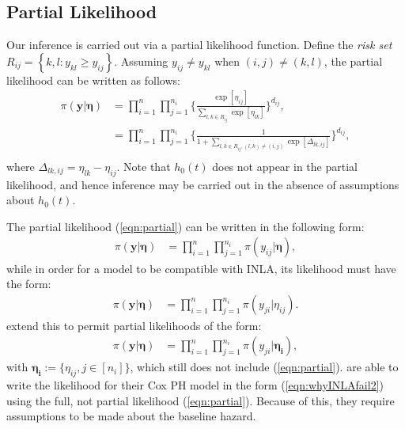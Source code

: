 \documentclass[ba]{imsart}
\begin{document}
\subsection{Partial Likelihood}

Our inference is carried out via a partial likelihood function. Define the \textit{risk set} $R_{ij} = \left\{k,l : y_{kl} \geq y_{ij}\right\}$. Assuming $y_{ij} \neq y_{kl}$ when $(i,j) \neq (k,l)$, the partial likelihood can be written as follows: 
\begin{equation}\begin{aligned}\label{eqn:partial}
\pi(\boldsymbol{y}|\boldsymbol{\eta}) &= \prod_{i=1}^{n}\prod_{j=1}^{n_{i}} \bigg\{\frac{\exp[\eta_{ij}]}{{\sum_{l,k\in R_{ij}}^{}\exp[\eta_{lk}]}}\bigg \}^{d_{ij}} , \\
&= \prod_{i=1}^{n}\prod_{j=1}^{n_{i}} \bigg\{\frac{1}{{1 + \sum_{l,k\in R_{ij} , (l,k) \neq (i,j)}\exp[\Delta_{lk,ij}]}}\bigg \}^{d_{ij}} , \\
\end{aligned}\end{equation}
where $\Delta_{lk,ij} = \eta_{lk} - \eta_{ij}$. Note that $h_{0}(t)$ does not appear in the partial likelihood, and hence inference may be carried out in the absence of assumptions about $h_{0}(t)$. 

The partial likelihood (\ref{eqn:partial}) can be written in the following form:
\begin{equation}\begin{aligned}\label{eqn:whyINLAfail1}
\pi(\boldsymbol{y}|\boldsymbol{\eta}) &= \prod_{i=1}^{n}\prod_{j=1}^{n_{i}} \pi(y_{ij}|\boldsymbol{\eta}),
\end{aligned}\end{equation}
while in order for a model to be compatible with INLA, its likelihood must have the form:
\begin{equation}\begin{aligned}\label{eqn:whyINLAfail2}
\pi(\boldsymbol{y}|\boldsymbol{\eta}) &= \prod_{i=1}^{n}\prod_{j=1}^{n_{i}} \pi(y_{ji}|\eta_{ij}).
\end{aligned}\end{equation}
\cite{casecross} extend this to permit partial likelihoods of the form:
\begin{equation}\begin{aligned}\label{eqn:casecrosslik}
\pi(\boldsymbol{y}|\boldsymbol{\eta}) &= \prod_{i=1}^{n}\prod_{j=1}^{n_{i}} \pi(y_{ji}|\boldsymbol{\eta_{i}}),
\end{aligned}\end{equation}
with $\boldsymbol{\eta_{i}} := \{ \eta_{ij}, j \in [n_i] \}$,  which still does not include (\ref{eqn:partial}). \cite{inlacoxph} are able to write the likelihood for their Cox PH model in the form (\ref{eqn:whyINLAfail2}) using the full, not partial likelihood (\ref{eqn:partial}). Because of this, they require assumptions to be made about the baseline hazard.
\end{document}
